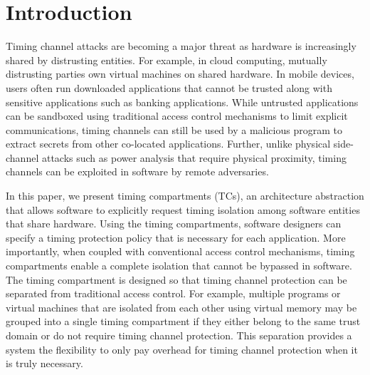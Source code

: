 \section{Introduction}

Timing channel attacks are becoming a major threat as hardware is increasingly 
shared by distrusting entities. For example, in cloud computing, mutually distrusting 
parties own virtual machines on shared hardware. In mobile devices, users often
run downloaded applications that cannot be trusted along with sensitive applications
such as banking applications.
While untrusted applications can be sandboxed using
traditional access control mechanisms to limit explicit communications,
timing 
channels can still be used by a malicious program to extract secrets from other
co-located applications.
Further, unlike physical side-channel attacks such as power analysis that require
physical proximity, timing channels can be exploited in software by remote
adversaries.



In this paper, we present timing compartments (TCs), an architecture abstraction 
that allows software to explicitly request timing isolation among software entities
that share hardware.
Using the timing compartments, software designers can specify a timing protection
policy that is necessary for each application. More importantly, when coupled with
conventional access control mechanisms, timing compartments enable a complete
isolation that cannot be bypassed in software. 
The timing compartment is designed so that timing channel protection can be
separated from traditional access control. For example, multiple programs or
virtual machines that are isolated from each other using virtual memory may
be grouped into a single timing compartment if they either belong to the 
same trust domain or do not require timing channel protection. 
This separation provides a system the flexibility to only pay overhead for
timing channel protection when it is truly necessary.

